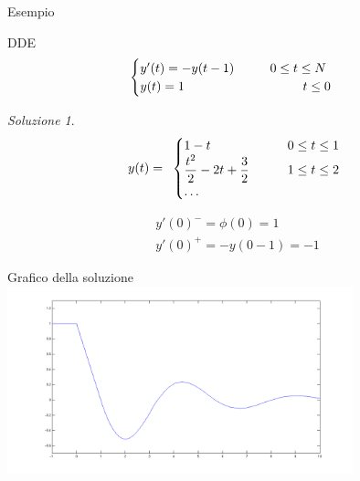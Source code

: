 \documentclass[intlimits]{beamer}
\numberwithin{equation}{section}
\theoremstyle{plain}
\theoremstyle{definition}
\theoremstyle{remark}
\newtheorem{soluzione}[teor]{Soluzione}
\begin{document}
\begin{frame}{Esempio}
\begin{block}{DDE}
$$
\begin{cases}
 y'(t)=-y(t-1)	\hspace{1cm}		0 \le 	t \le N			\\
 y(t)=1		\hspace{3.3cm}			t \le 0
\end{cases}
$$
\end{block}

\begin{soluzione}
 $$
y(t)=
\begin{array}{lc lc}
\begin{cases}
\displaystyle
1-t												&	\hspace{0.7cm}	0 \le t \le 1	\\
\displaystyle
\frac{t^2}{2}-2t+\frac{3}{2}									&	\hspace{0.7cm}	1 \le t \le 2	\\
\dots
\end{cases}
\end{array}
$$



\end{soluzione}

\pause

\begin{block}{}
 $$
\begin{array}{l}
y'(0)^-=\phi(0)=1 \\
y'(0)^+ = -y(0-1) =- 1
\end{array}
$$
\end{block}

\end{frame}



\begin{frame}{Grafico della soluzione}
 \includegraphics[width=10cm]{immagini/immagine12.png}
\end{frame}
\end{document}
